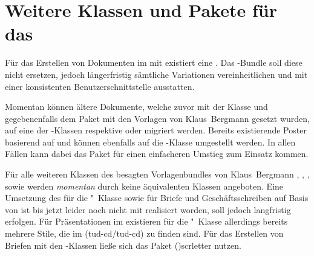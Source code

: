 \section{Weitere Klassen und Pakete für das \CD}

Für das Erstellen von Dokumenten im \TUDCD mit  existiert eine 
. 
Das \TUDScript-Bundle soll diese nicht ersetzen, jedoch längerfristig sämtliche 
Variationen vereinheitlichen und mit einer konsistenten Benutzerschnittstelle 
ausstatten. 

Momentan können ältere Dokumente, welche zuvor mit der Klasse 
 und gegebenenfalls dem Paket 
 mit den Vorlagen von Klaus~Bergmann 
gesetzt wurden, auf eine der \TUDScript-Klassen  respektive 
 oder  migriert werden. Bereits 
existierende Poster basierend auf  und 
 können ebenfalls auf die 
\TUDScript-Klasse  umgestellt werden. In allen Fällen kann 
dabei das Paket  für einen einfacheren Umstieg zum Einsatz 
kommen. 

Für alle weiteren Klassen des besagten Vorlagenbundles von Klaus~Bergmann
, ,
,  sowie
 werden \emph{momentan} durch \TUDScript
keine äquivalenten Klassen angeboten.
%
Eine Umsetzung des \CDs für die "~Klasse sowie für Briefe und 
Geschäftsschreiben auf Basis von \KOMAScript ist bis jetzt leider noch nicht 
mit \TUDScript realisiert worden, soll jedoch langfristig erfolgen. Für 
Präsentationen im \TUDCD existieren für die "~Klasse allerdings 
bereits mehrere Stile, die im \GitHubRepo(tud-cd/tud-cd) zu finden sind. 
Für das Erstellen von Briefen mit den \TUDScript-Klassen ließe sich das Paket 
\Package(){scrletter} nutzen.



